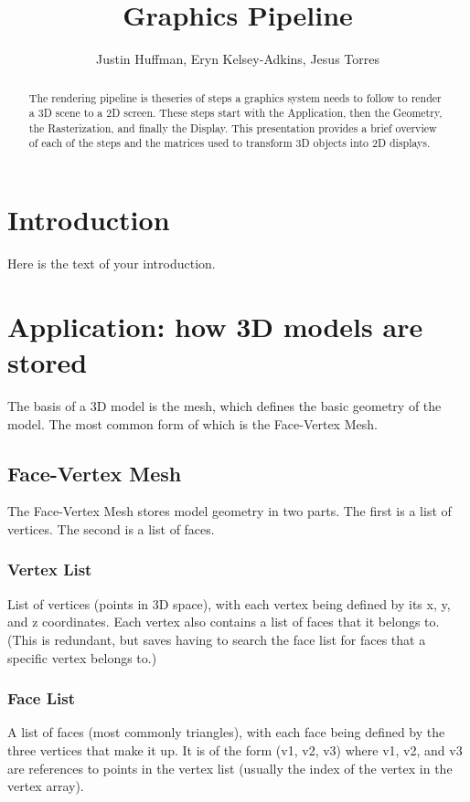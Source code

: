 \documentclass{article}
\begin{document}
\title{Graphics Pipeline}
\author{Justin Huffman, Eryn Kelsey-Adkins, Jesus Torres}

\maketitle

\begin{abstract}
The rendering pipeline is theseries of steps a graphics system needs to follow to render a 3D scene to a 2D screen. These steps start with the Application, then the Geometry, the Rasterization, and finally the Display. This presentation provides a brief overview of each of the steps and the matrices used to transform 3D objects into 2D displays.
\end{abstract}

\section{Introduction}
Here is the text of your introduction.

\section{Application: how 3D models are stored}
The basis of a 3D model is the mesh, which defines the basic geometry of the model. The most common form of which is the Face-Vertex Mesh.

\subsection{Face-Vertex Mesh}
The Face-Vertex Mesh stores model geometry in two parts. The first is a list of vertices. The second is a list of faces.

\subsubsection{Vertex List}
List of vertices (points in 3D space), with each vertex being defined by its x, y, and z coordinates. Each vertex also contains a list of faces that it belongs to. (This is redundant, but saves having to search the face list for faces that a specific vertex belongs to.)

\subsubsection{Face List}
A list of faces (most commonly triangles), with each face being defined by the three vertices that make it up. It is of the form (v1, v2, v3) where v1, v2, and v3 are references to points in the vertex list (usually the index of the vertex in the vertex array).
\end{document}
